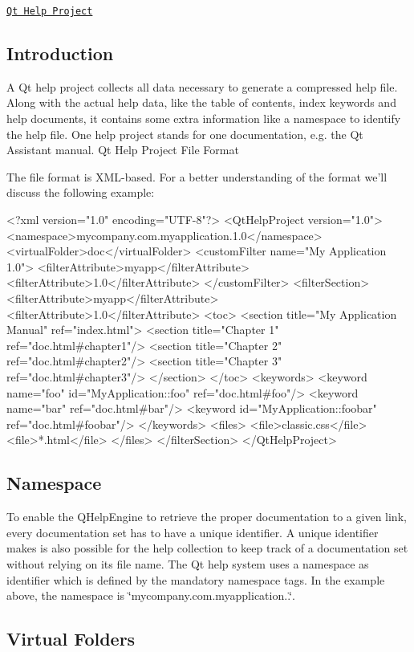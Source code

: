 \href{http://qt-project.org/doc/qt-4.8/qthelpproject.html}{\tt Qt Help Project}\hypertarget{helpproject_helpproject-intro}{}\subsection{Introduction}\label{helpproject_helpproject-intro}
A Qt help project collects all data necessary to generate a compressed help file. Along with the actual help data, like the table of contents, index keywords and help documents, it contains some extra information like a namespace to identify the help file. One help project stands for one documentation, e.\-g. the Qt Assistant manual. Qt Help Project File Format

The file format is X\-M\-L-\/based. For a better understanding of the format we'll discuss the following example\-: \begin{DoxyVerb}<?xml version="1.0" encoding="UTF-8"?>
<QtHelpProject version="1.0">
    <namespace>mycompany.com.myapplication.1.0</namespace>
    <virtualFolder>doc</virtualFolder>
    <customFilter name="My Application 1.0">
  <filterAttribute>myapp</filterAttribute>
  <filterAttribute>1.0</filterAttribute>
    </customFilter>
    <filterSection>
  <filterAttribute>myapp</filterAttribute>
  <filterAttribute>1.0</filterAttribute>
  <toc>
      <section title="My Application Manual" ref="index.html">
    <section title="Chapter 1" ref="doc.html#chapter1"/>
    <section title="Chapter 2" ref="doc.html#chapter2"/>
    <section title="Chapter 3" ref="doc.html#chapter3"/>
      </section>
  </toc>
  <keywords>
      <keyword name="foo" id="MyApplication::foo" ref="doc.html#foo"/>
      <keyword name="bar" ref="doc.html#bar"/>
      <keyword id="MyApplication::foobar" ref="doc.html#foobar"/>
  </keywords>
  <files>
      <file>classic.css</file>
      <file>*.html</file>
  </files>
    </filterSection>
</QtHelpProject>
\end{DoxyVerb}
\hypertarget{helpproject_helpproject-Namespace}{}\subsection{Namespace}\label{helpproject_helpproject-Namespace}
To enable the Q\-Help\-Engine to retrieve the proper documentation to a given link, every documentation set has to have a unique identifier. A unique identifier makes is also possible for the help collection to keep track of a documentation set without relying on its file name. The Qt help system uses a namespace as identifier which is defined by the mandatory namespace tags. In the example above, the namespace is \char`\"{}mycompany.\-com.\-myapplication..\char`\"{}.\hypertarget{helpproject_hp_virtualfolder}{}\subsection{Virtual Folders}\label{helpproject_hp_virtualfolder}
